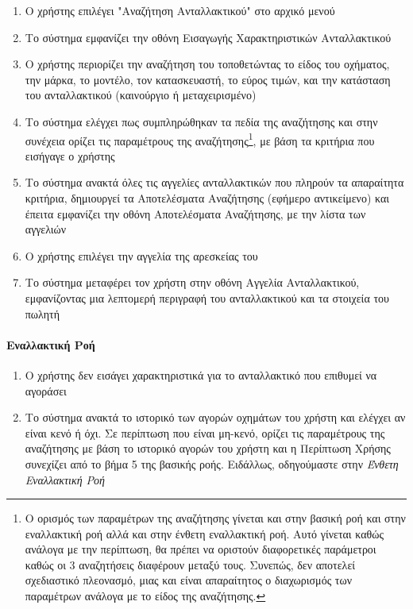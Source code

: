 \documentclass{../ol-softwaremanual}
\begin{document}
	\begin{enumerate}
		\item Ο χρήστης επιλέγει \en"\gr Αναζήτηση Ανταλλακτικού\en" \gr στο αρχικό μενού
		\item Το σύστημα εμφανίζει την οθόνη Εισαγωγής Χαρακτηριστικών Ανταλλακτικού
		\item Ο χρήστης περιορίζει την αναζήτηση του τοποθετώντας το είδος του οχήματος, την μάρκα, το μοντέλο, τον κατασκευαστή, το εύρος τιμών, και την κατάσταση του ανταλλακτικού (καινούργιο ή μεταχειρισμένο) 
		\item Το σύστημα ελέγχει πως συμπληρώθηκαν τα πεδία της αναζήτησης και στην συνέχεια ορίζει τις παραμέτρους της αναζήτησης\footnote[3]{Ο ορισμός των παραμέτρων της αναζήτησης γίνεται και στην βασική ροή και στην εναλλακτική ροή αλλά και στην ένθετη εναλλακτική ροή. Αυτό γίνεται καθώς ανάλογα με την περίπτωση, θα πρέπει να οριστούν διαφορετικές παράμετροι καθώς οι 3 αναζητήσεις διαφέρουν μεταξύ τους. Συνεπώς, δεν αποτελεί σχεδιαστικό πλεονασμό, μιας και είναι απαραίτητος ο διαχωρισμός των παραμέτρων ανάλογα με το είδος της αναζήτησης.}, με βάση τα κριτήρια που εισήγαγε ο χρήστης
		\item Το σύστημα ανακτά όλες τις αγγελίες ανταλλακτικών που πληρούν τα απαραίτητα κριτήρια, δημιουργεί τα Αποτελέσματα Αναζήτησης (εφήμερο αντικείμενο) και έπειτα εμφανίζει την οθόνη Αποτελέσματα Αναζήτησης, με την λίστα των αγγελιών
		\item Ο χρήστης επιλέγει την αγγελία της αρεσκείας του
		\item Το σύστημα μεταφέρει τον χρήστη στην οθόνη Αγγελία Ανταλλακτικού, εμφανίζοντας μια λεπτομερή περιγραφή του ανταλλακτικού και τα στοιχεία του πωλητή		
	\end{enumerate}
	
	\paragraph{Εναλλακτική Ροή}
	
	\begin{enumerate}
		\item Ο χρήστης δεν εισάγει χαρακτηριστικά για το ανταλλακτικό που επιθυμεί να αγοράσει
		\item Το σύστημα ανακτά το ιστορικό των αγορών οχημάτων του χρήστη και ελέγχει αν είναι κενό ή όχι. Σε περίπτωση που είναι μη-κενό, ορίζει τις παραμέτρους της αναζήτησης με βάση το ιστορικό αγορών του χρήστη και η Περίπτωση Χρήσης συνεχίζει από το βήμα 5 της βασικής ροής. Ειδάλλως, οδηγούμαστε στην \textit{Ένθετη Εναλλακτική Ροή}	
	\end{enumerate}
	
\end{document}
